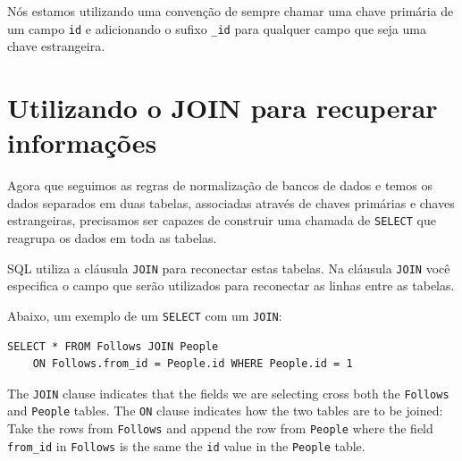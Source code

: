 
Nós estamos utilizando uma convenção de sempre chamar uma chave primária de
um campo {\tt id} e adicionando o sufixo \verb"_id" para qualquer campo que
seja uma chave estrangeira.

\section{Utilizando o JOIN para recuperar informações}


Agora que seguimos as regras de normalização de bancos de dados e temos os
dados separados em duas tabelas, associadas através de chaves primárias e
chaves estrangeiras, precisamos ser capazes de construir uma chamada de
{\tt SELECT} que reagrupa os dados em toda as tabelas.


SQL utiliza a cláusula {\tt JOIN} para reconectar estas tabelas. Na cláusula
{\tt JOIN} você especifica o campo que serão utilizados para reconectar as
linhas entre as tabelas.


Abaixo, um exemplo de um {\tt SELECT} com um {\tt JOIN}:

\beforeverb
\begin{verbatim}
SELECT * FROM Follows JOIN People 
    ON Follows.from_id = People.id WHERE People.id = 1
\end{verbatim}
\afterverb
%
The {\tt JOIN} clause indicates that the fields we are selecting
cross both the {\tt Follows} and {\tt People} tables.  The {\tt ON}
clause indicates how the two tables are to be joined:  Take the rows
from {\tt Follows} and append the row from {\tt People} where the
field \verb"from_id" in {\tt Follows} is the same the {\tt id} value
in the {\tt People} table.

